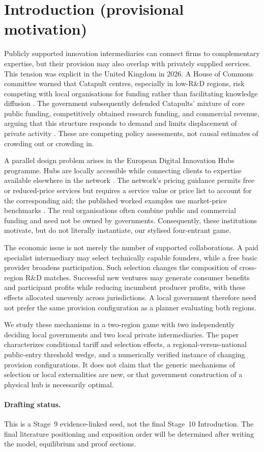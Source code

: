 \section{Introduction (provisional motivation)}
Publicly supported innovation intermediaries can connect firms to complementary expertise, but their provision may also overlap with privately supplied services. This tension was explicit in the United Kingdom in 2026. A House of Commons committee warned that Catapult centres, especially in low-R\&D regions, risk competing with local organisations for funding rather than facilitating knowledge diffusion \citep[paras.~80--84]{UKCommittee2026}. The government subsequently defended Catapults' mixture of core public funding, competitively obtained research funding, and commercial revenue, arguing that this structure responds to demand and limits displacement of private activity \citep{UKGovernment2026}. These are competing policy assessments, not causal estimates of crowding out or crowding in.

A parallel design problem arises in the European Digital Innovation Hubs programme. Hubs are locally accessible while connecting clients to expertise available elsewhere in the network \citep{EuropeanCommissionEDIH}. The network's pricing guidance permits free or reduced-price services but requires a service value or price list to account for the corresponding aid; the published worked examples use market-price benchmarks \citep{EDIHFAQ2026}. The real organisations often combine public and commercial funding and need not be owned by governments. Consequently, these institutions motivate, but do not literally instantiate, our stylised four-entrant game.

The economic issue is not merely the number of supported collaborations. A paid specialist intermediary may select technically capable founders, while a free basic provider broadens participation. Such selection changes the composition of cross-region R\&D matches. Successful new ventures may generate consumer benefits and participant profits while reducing incumbent producer profits, with these effects allocated unevenly across jurisdictions. A local government therefore need not prefer the same provision configuration as a planner evaluating both regions.

We study these mechanisms in a two-region game with two independently deciding local governments and two local private intermediaries. The paper characterizes conditional tariff and selection effects, a regional-versus-national public-entry threshold wedge, and a numerically verified instance of changing provision configurations. It does not claim that the generic mechanisms of selection or local externalities are new, or that government construction of a physical hub is necessarily optimal.

\paragraph{Drafting status.} This is a Stage~9 evidence-linked seed, not the final Stage~10 Introduction. The final literature positioning and exposition order will be determined after writing the model, equilibrium and proof sections.
